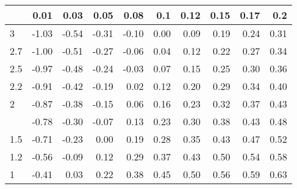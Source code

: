 
\begin{tabular}{lrrrrrrrrr}
\toprule
  & 0.01 & 0.03 & 0.05 & 0.08 & 0.1 & 0.12 & 0.15 & 0.17 & 0.2\\
\midrule
3 & -1.03 & -0.54 & -0.31 & -0.10 & 0.00 & 0.09 & 0.19 & 0.24 & 0.31\\
2.7 & -1.00 & -0.51 & -0.27 & -0.06 & 0.04 & 0.12 & 0.22 & 0.27 & 0.34\\
2.5 & -0.97 & -0.48 & -0.24 & -0.03 & 0.07 & 0.15 & 0.25 & 0.30 & 0.36\\
2.2 & -0.91 & -0.42 & -0.19 & 0.02 & 0.12 & 0.20 & 0.29 & 0.34 & 0.40\\
2 & -0.87 & -0.38 & -0.15 & 0.06 & 0.16 & 0.23 & 0.32 & 0.37 & 0.43\\
\addlinespace
1.7 & -0.78 & -0.30 & -0.07 & 0.13 & 0.23 & 0.30 & 0.38 & 0.43 & 0.48\\
1.5 & -0.71 & -0.23 & 0.00 & 0.19 & 0.28 & 0.35 & 0.43 & 0.47 & 0.52\\
1.2 & -0.56 & -0.09 & 0.12 & 0.29 & 0.37 & 0.43 & 0.50 & 0.54 & 0.58\\
1 & -0.41 & 0.03 & 0.22 & 0.38 & 0.45 & 0.50 & 0.56 & 0.59 & 0.63\\
\bottomrule
\end{tabular}
